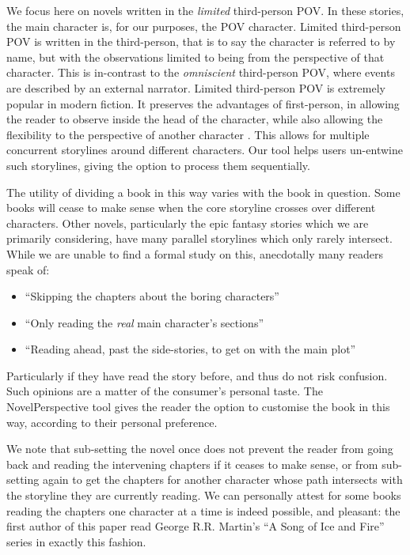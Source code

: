 \documentclass[11pt,a4paper]{article}
\newcommand{\parencite}{\citep}
\begin{document}
We focus here on novels written in the \emph{limited} third-person POV.
In these stories, the main character is, for our purposes, the POV character.
Limited third-person POV is written in the third-person, that is to say the character is referred to by name, but with the observations limited to being from the perspective of that character.
This is in-contrast to the \emph{omniscient} third-person POV, where events are described by an external narrator.
Limited third-person POV is extremely popular in modern fiction.
It preserves the advantages of first-person, in allowing the reader to observe inside the head of the character, while also allowing the flexibility to the perspective of another character \parencite{booth2010rhetoric}.
This allows for multiple concurrent storylines around different characters.
Our tool helps users un-entwine such storylines, giving the option to process them sequentially.


The utility of dividing a book in this way varies with the book in question.
Some books will cease to make sense when the core storyline crosses over different characters.
Other novels, particularly the epic fantasy stories which we are primarily considering,
have many parallel storylines which only rarely intersect.
While we are unable to find a formal study on this, 
anecdotally many readers speak of:
\begin{itemize}
	\item ``Skipping the chapters about the boring characters''
	\item ``Only reading the \emph{real} main character's sections''
	\item ``Reading ahead, past the side-stories, to get on with the main plot''	
\end{itemize}
Particularly if they have read the story before, and thus do not risk confusion.
Such opinions are a matter of the consumer's personal taste.
The NovelPerspective tool gives the reader the option to customise the book in this way, according to their personal preference.

We note that sub-setting the novel once does not prevent the reader from going back and reading the intervening chapters if it ceases to make sense, or from sub-setting again to get the chapters for another character whose path intersects with the storyline they are currently reading.
We can personally attest for some books reading the chapters one character at a time is indeed possible, and pleasant: the first author of this paper read George R.R. Martin's ``A Song of Ice and Fire'' series in exactly this fashion.
\end{document}
